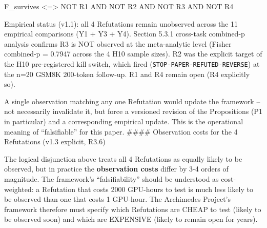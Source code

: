 \documentclass[
]{article}
\begin{document}
F\_survives \textless=\textgreater{} NOT R1 AND NOT R2 AND NOT R3 AND
NOT R4

Empirical status (v1.1): all 4 Refutations remain unobserved across the
11 empirical comparisons (Y1 + Y3 + Y4). Section 5.3.1 cross-task
combined-p analysis confirms R3 is NOT observed at the meta-analytic
level (Fisher combined-p = 0.7947 across the 4 H10 sample sizes). R2 was
the explicit target of the H10 pre-registered kill switch, which fired
(\texttt{STOP-PAPER-REFUTED-REVERSE}) at the n=20 GSM8K 200-token
follow-up. R1 and R4 remain open (R4 explicitly so).

A single observation matching any one Refutation would update the
framework -- not necessarily invalidate it, but force a versioned
revision of the Propositions (P1 in particular) and a corresponding
empirical update. This is the operational meaning of ``falsifiable'' for
this paper. \#\#\#\# Observation costs for the 4 Refutations (v1.3
explicit, R3.6)

The logical disjunction above treats all 4 Refutations as equally likely
to be observed, but in practice the \textbf{observation costs} differ by
3-4 orders of magnitude. The framework's ``falsifiability'' should be
understood as cost-weighted: a Refutation that costs 2000 GPU-hours to
test is much less likely to be observed than one that costs 1 GPU-hour.
The Archimedes Project's framework therefore must specify which
Refutations are CHEAP to test (likely to be observed soon) and which are
EXPENSIVE (likely to remain open for years).
\end{document}
